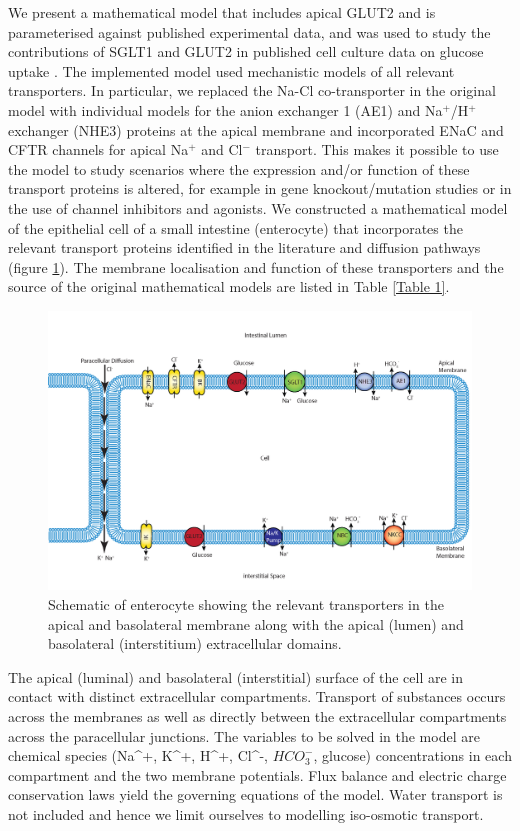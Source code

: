 \documentclass[fleqn,10pt]{physiome}
\begin{document}
We present a mathematical model that includes apical GLUT2 and is parameterised against published experimental data, and was used to study the contributions of SGLT1 and GLUT2 in published cell culture data on glucose uptake \citep{zheng2012mechanisms}. The implemented model used mechanistic models of all relevant transporters. In particular, we replaced the Na-Cl co-transporter in the original model with individual models for the anion
exchanger 1 (AE1) and Na$^+$/H$^+$ exchanger (NHE3) proteins at the apical
membrane and incorporated ENaC and CFTR channels for apical Na$^+$ and Cl$^-$ transport.
This makes it possible to use the model to study scenarios where the
expression and/or function of these transport proteins is altered, for example
in gene knockout/mutation studies or in the use of channel inhibitors and agonists. We constructed a mathematical model of the epithelial cell of a small intestine (enterocyte) that incorporates the relevant transport proteins identified in the
literature \citep{barrett2015electrolyte} and diffusion pathways (figure \ref{fig.1}). The
membrane localisation and function of these transporters and the source of the
original mathematical models are listed in Table \ref{Table 1}.\newline

\begin{figure}[H]
\centering
\includegraphics[width=0.85\linewidth]{fig01.jpg}
\caption{Schematic of enterocyte showing the relevant
transporters in the apical and basolateral membrane along with
the apical (lumen) and basolateral (interstitium) extracellular
domains.}
\label{fig.1}
\end{figure}\newline


The apical (luminal) and
basolateral (interstitial) surface of the cell are in contact with distinct extracellular
compartments. Transport of substances occurs across the membranes as
well as directly between the extracellular compartments across the paracellular
junctions. The variables to be solved in the model are chemical species ({Na^+},
{K^+}, {H^+}, {Cl^-}, ${HCO_3^-}$, glucose) concentrations in each compartment and the
two membrane potentials. Flux balance and electric charge conservation laws
yield the governing equations of the model. Water transport is not included and
hence we limit ourselves to modelling iso-osmotic transport.\newline
\end{document}
